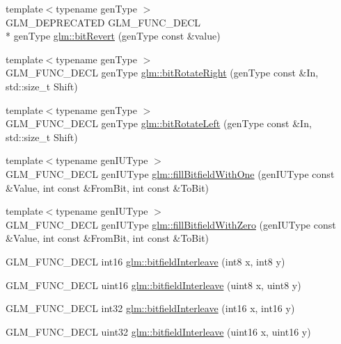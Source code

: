 \begin{DoxyCompactItemize}
{\footnotesize template$<$typename gen\-Type $>$ }\\G\-L\-M\-\_\-\-D\-E\-P\-R\-E\-C\-A\-T\-E\-D G\-L\-M\-\_\-\-F\-U\-N\-C\-\_\-\-D\-E\-C\-L \\*
gen\-Type \hyperlink{group__gtx__bit_ga2d3939fbf96aa54cb2fd3461a60aba02}{glm\-::bit\-Revert} (gen\-Type const \&value)
\item 
{\footnotesize template$<$typename gen\-Type $>$ }\\G\-L\-M\-\_\-\-F\-U\-N\-C\-\_\-\-D\-E\-C\-L gen\-Type \hyperlink{group__gtx__bit_gaf999dbfe97a5be5ea68841a58cf89a4a}{glm\-::bit\-Rotate\-Right} (gen\-Type const \&In, std\-::size\-\_\-t Shift)
\item 
{\footnotesize template$<$typename gen\-Type $>$ }\\G\-L\-M\-\_\-\-F\-U\-N\-C\-\_\-\-D\-E\-C\-L gen\-Type \hyperlink{group__gtx__bit_ga32c0a5149152a9aa75afafe81b19be53}{glm\-::bit\-Rotate\-Left} (gen\-Type const \&In, std\-::size\-\_\-t Shift)
\item 
{\footnotesize template$<$typename gen\-I\-U\-Type $>$ }\\G\-L\-M\-\_\-\-F\-U\-N\-C\-\_\-\-D\-E\-C\-L gen\-I\-U\-Type \hyperlink{group__gtx__bit_gafac2a9e0ef0d5d2fc4e569bff2b2f452}{glm\-::fill\-Bitfield\-With\-One} (gen\-I\-U\-Type const \&Value, int const \&From\-Bit, int const \&To\-Bit)
\item 
{\footnotesize template$<$typename gen\-I\-U\-Type $>$ }\\G\-L\-M\-\_\-\-F\-U\-N\-C\-\_\-\-D\-E\-C\-L gen\-I\-U\-Type \hyperlink{group__gtx__bit_ga0c514d45387003260783ba6a8a4f3285}{glm\-::fill\-Bitfield\-With\-Zero} (gen\-I\-U\-Type const \&Value, int const \&From\-Bit, int const \&To\-Bit)
\item 
G\-L\-M\-\_\-\-F\-U\-N\-C\-\_\-\-D\-E\-C\-L int16 \hyperlink{group__gtx__bit_ga479134317bc95d99f2b2e235d3db287b}{glm\-::bitfield\-Interleave} (int8 x, int8 y)
\item 
G\-L\-M\-\_\-\-F\-U\-N\-C\-\_\-\-D\-E\-C\-L uint16 \hyperlink{group__gtx__bit_ga0700a3ceb088a0ecc23d76c154096061}{glm\-::bitfield\-Interleave} (uint8 x, uint8 y)
\item 
G\-L\-M\-\_\-\-F\-U\-N\-C\-\_\-\-D\-E\-C\-L int32 \hyperlink{group__gtx__bit_ga1a0264598647ae00a596865af4e1e878}{glm\-::bitfield\-Interleave} (int16 x, int16 y)
\item 
G\-L\-M\-\_\-\-F\-U\-N\-C\-\_\-\-D\-E\-C\-L uint32 \hyperlink{group__gtx__bit_ga19ef8360379483e3ee245e89cb62ff93}{glm\-::bitfield\-Interleave} (uint16 x, uint16 y)
\item 

\end{DoxyCompactItemize}
